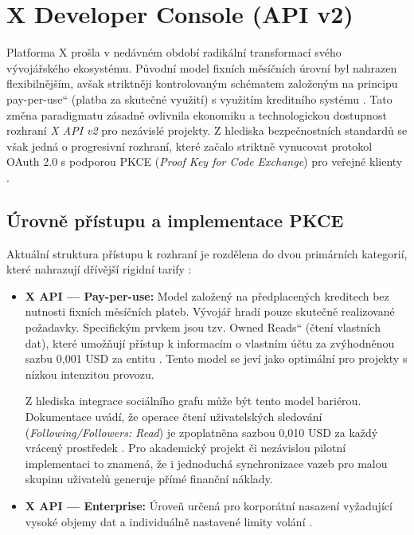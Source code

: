 \documentclass[male,czech,api_bc]{kitheses}
\newcommand{\UV}[1]{\quotedblbase#1\textquotedblleft}
\begin{document}
\section{X Developer Console (API v2)}

Platforma X prošla v nedávném období radikální transformací svého vývojářského ekosystému. Původní model fixních měsíčních úrovní byl nahrazen flexibilnějším, avšak striktněji kontrolovaným schématem založeným na principu \UV{pay-per-use} (platba za skutečné využití) s využitím kreditního systému \cite{XDev2026,XCorpnd}. Tato změna paradigmatu zásadně ovlivnila ekonomiku a technologickou dostupnost rozhraní \textit{X API v2} pro nezávislé projekty. Z hlediska bezpečnostních standardů se však jedná o progresivní rozhraní, které začalo striktně vynucovat protokol OAuth 2.0 s podporou PKCE (\textit{Proof Key for Code Exchange}) pro veřejné klienty \cite{SakimuraEd2015, XDev2026}.

\subsection{Úrovně přístupu a implementace PKCE}
\label{subsec:urovne_pristupu_a_implementace_pkce}

Aktuální struktura přístupu k rozhraní je rozdělena do dvou primárních kategorií, které nahrazují dřívější rigidní tarify \cite{XDev2026}:

\begin{itemize}
    \item \textbf{X API — Pay-per-use:} Model založený na předplacených kreditech bez nutnosti fixních měsíčních plateb. Vývojář hradí pouze skutečně realizované požadavky. Specifickým prvkem jsou tzv. \UV{Owned Reads} (čtení vlastních dat), které umožňují přístup k informacím o vlastním účtu za zvýhodněnou sazbu 0,001 USD za entitu \cite{XCorpnd}. Tento model se jeví jako optimální pro projekty s nízkou intenzitou provozu.

    Z hlediska integrace sociálního grafu může být tento model bariérou. Dokumentace uvádí, že operace čtení uživatelských sledování (\textit{Following/Followers: Read}) je zpoplatněna sazbou 0,010 USD za každý vrácený prostředek \cite{XCorpnd}. Pro akademický projekt či nezávislou pilotní implementaci to znamená, že i jednoduchá synchronizace vazeb pro malou skupinu uživatelů generuje přímé finanční náklady.
    
    \item \textbf{X API — Enterprise:} Úroveň určená pro korporátní nasazení vyžadující vysoké objemy dat a individuálně nastavené limity volání \cite{XDev2026}.
\end{itemize}
\end{document}
